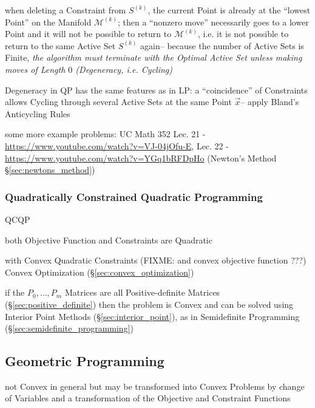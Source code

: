 when deleting a Constraint from $S^{(k)}$, the current Point is already at the
``lowest Point'' on the Manifold $\mathcal{M}^{(k)}$; then a ``nonzero move''
necessarily goes to a lower Point and it will not be possible to return to
$\mathcal{M}^{(k)}$, i.e. it is not possible to return to the same Active Set
$S^{(k)}$ again-- because the number of Active Sets is Finite, \emph{the
  algorithm must terminate with the Optimal Active Set unless making moves of
  Length $0$ (Degeneracy, i.e. Cycling)}

Degeneracy in QP has the same features as in LP: a ``coincidence'' of
Constraints allows Cycling through several Active Sets at the same Point
$\vec{x}$-- apply Bland's Anticycling Rules

some more example problems: UC Math 352 Lec. 21 -
\url{https://www.youtube.com/watch?v=VJ-04jOfu-E},
Lec. 22 - \url{https://www.youtube.com/watch?v=YGq1bRFDpHo} (Newton's Method \S\ref{sec:newtons_method})



\subsubsection{Quadratically Constrained Quadratic Programming}
\label{sec:quadratically_constrained}

QCQP

both Objective Function and Constraints are Quadratic

with Convex Quadratic Constraints (FIXME: and convex objective function ???)
\fist Convex Optimization (\S\ref{sec:convex_optimization})

if the $P_0,\ldots,P_m$ Matrices are all Positive-definite Matrices
(\S\ref{sec:positive_definite}) then the problem is Convex and can be solved
using Interior Point Methods (\S\ref{sec:interior_point}), as in
Semidefinite Programming (\S\ref{sec:semidefinite_programming})



\subsection{Geometric Programming}\label{sec:geometric_programming}

not Convex in general but may be transformed into Convex Problems by change of
Variables and a transformation of the Objective and Constraint Functions

